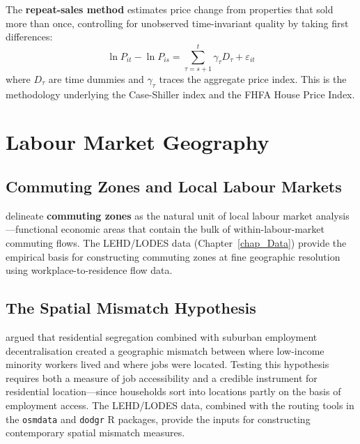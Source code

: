 The \textbf{repeat-sales method} \citep{Bailey1963,
Case1989} estimates price change from properties that sold more than once,
controlling for unobserved time-invariant quality by taking first differences:
\begin{equation}
  \ln P_{it} - \ln P_{is} = \sum_{\tau=s+1}^{t} \gamma_\tau D_\tau + \varepsilon_{it}
\end{equation}
where $D_\tau$ are time dummies and $\gamma_\tau$ traces the aggregate price
index. This is the methodology underlying the Case-Shiller index and the
FHFA House Price Index.



\section{Labour Market Geography}
\label{sec_LabourGeo}

\subsection{Commuting Zones and Local Labour Markets}

\citet{AutorDornHanson2013} delineate \textbf{commuting zones}
as the natural unit of local labour market analysis---functional economic
areas that contain the bulk of within-labour-market commuting flows.
The LEHD/LODES data (Chapter~\ref{chap_Data}) provide the empirical basis
for constructing commuting zones at fine geographic resolution using
workplace-to-residence flow data.

\subsection{The Spatial Mismatch Hypothesis}

\citet{Kain1968} argued that residential segregation combined with suburban
employment decentralisation created a geographic mismatch between where
low-income minority workers lived and where jobs were located.
Testing this hypothesis requires both a measure of job accessibility and
a credible instrument for residential location---since households sort into
locations partly on the basis of employment access. The LEHD/LODES data,
combined with the routing tools in the \texttt{osmdata} and \texttt{dodgr}
R packages, provide the inputs for constructing contemporary spatial
mismatch measures.


\renewcommand\bibname{Further reading}
\begin{subappendices}


\end{subappendices}

